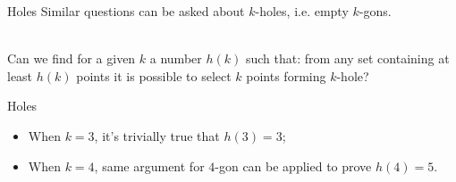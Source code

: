\documentclass{beamer}
\begin{document}
\begin{frame}{Holes}
    Similar questions can be asked about $k$-holes, i.e. empty $k$-gons. \\~\


     Can we find for a given $k$ a number $h(k)$ such that: from any set containing at least $h(k)$ points it is possible to select $k$ points forming $k$-hole?
     
\end{frame}

\begin{frame}{Holes}
    
\begin{itemize}
\item 
When $k=3$, it's trivially true that $h(3) = 3$;
\item
When $k=4$, same argument for $4$-gon can be applied to prove $h(4) = 5$.
\end{itemize}
\end{frame}
\end{document}
